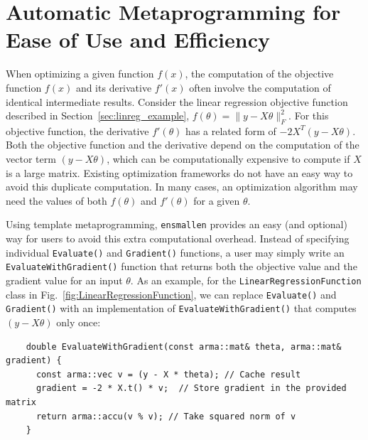 \documentclass{article}
\begin{document}
\vspace*{-0.3em}
\section{Automatic Metaprogramming for Ease of Use and Efficiency}
\vspace*{-0.5em}

When optimizing a given function $f(x)$, the computation of
the objective function $f(x)$ and its derivative $f'(x)$ often involve the
computation of identical intermediate results.  Consider the linear regression
objective function described
in Section~\ref{sec:linreg_example}, {\small $f(\theta) = \| y - X\theta \|_F^2$}.
For this objective function, the derivative $f'(\theta)$ has a related form of
{\small $-2 X^T (y -X \theta)$}.  Both the objective function and the derivative 
depend on the computation of the vector term {\small $(y - X \theta)$},
which can be computationally expensive to compute if $X$ is a large matrix.
Existing optimization frameworks do not have an easy way to avoid
this duplicate computation. In many cases, an optimization algorithm
may need the values of both $f(\theta)$ and $f'(\theta)$ for a given $\theta$.

Using template metaprogramming, {\tt ensmallen} provides an easy (and
optional) way for users to avoid this extra computational overhead.  Instead of
specifying individual \texttt{\small Evaluate()} and \texttt{\small Gradient()} functions, a user
may simply write an \texttt{\small EvaluateWithGradient()} function that returns both the
objective value and the gradient value for an input $\theta$.  As an example,
for the 
\texttt{LinearRegressionFunction} class in Fig.~\ref{fig:LinearRegressionFunction},
we can replace \texttt{\small Evaluate()} and \texttt{\small Gradient()}
with an implementation of \texttt{\small EvaluateWithGradient()}
that computes {\small $(y - X \theta)$} only once:

\begin{adjustbox}{scale={0.95}{0.95}}
\begin{minipage}{1\textwidth}
\begin{verbatim}
    double EvaluateWithGradient(const arma::mat& theta, arma::mat& gradient) {
      const arma::vec v = (y - X * theta); // Cache result
      gradient = -2 * X.t() * v;  // Store gradient in the provided matrix
      return arma::accu(v % v); // Take squared norm of v
    }
\end{verbatim}
\end{minipage}
\end{adjustbox}
\end{document}
